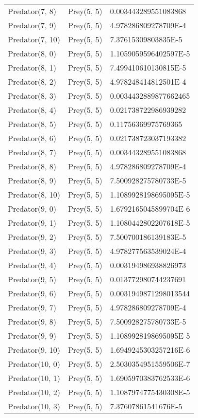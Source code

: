 \begin{longtable}{| p{} | p{} | p{} |}
Predator(7, 8) & Prey(5, 5) &0.003443289551083868\\
Predator(7, 9) & Prey(5, 5) &4.978286809278709E-4\\
Predator(7, 10) & Prey(5, 5) &7.37615309803835E-5\\
Predator(8, 0) & Prey(5, 5) &1.1059059596402597E-5\\
Predator(8, 1) & Prey(5, 5) &7.499410610130815E-5\\
Predator(8, 2) & Prey(5, 5) &4.978248414812501E-4\\
Predator(8, 3) & Prey(5, 5) &0.0034432889877662465\\
Predator(8, 4) & Prey(5, 5) &0.021738722986939282\\
Predator(8, 5) & Prey(5, 5) &0.11756369975769365\\
Predator(8, 6) & Prey(5, 5) &0.021738723037193382\\
Predator(8, 7) & Prey(5, 5) &0.003443289551083868\\
Predator(8, 8) & Prey(5, 5) &4.978286809278709E-4\\
Predator(8, 9) & Prey(5, 5) &7.500928275780733E-5\\
Predator(8, 10) & Prey(5, 5) &1.1089928198695095E-5\\
Predator(9, 0) & Prey(5, 5) &1.6792165045899704E-6\\
Predator(9, 1) & Prey(5, 5) &1.1080442802207618E-5\\
Predator(9, 2) & Prey(5, 5) &7.500700186139183E-5\\
Predator(9, 3) & Prey(5, 5) &4.978277563539024E-4\\
Predator(9, 4) & Prey(5, 5) &0.003194986938826973\\
Predator(9, 5) & Prey(5, 5) &0.013772980744237691\\
Predator(9, 6) & Prey(5, 5) &0.0031949871298013544\\
Predator(9, 7) & Prey(5, 5) &4.978286809278709E-4\\
Predator(9, 8) & Prey(5, 5) &7.500928275780733E-5\\
Predator(9, 9) & Prey(5, 5) &1.1089928198695095E-5\\
Predator(9, 10) & Prey(5, 5) &1.6949245303257216E-6\\
Predator(10, 0) & Prey(5, 5) &2.5030354951559506E-7\\
Predator(10, 1) & Prey(5, 5) &1.6905970383762533E-6\\
Predator(10, 2) & Prey(5, 5) &1.1087974775430308E-5\\
Predator(10, 3) & Prey(5, 5) &7.37607861541676E-5\\

\end{longtable}
